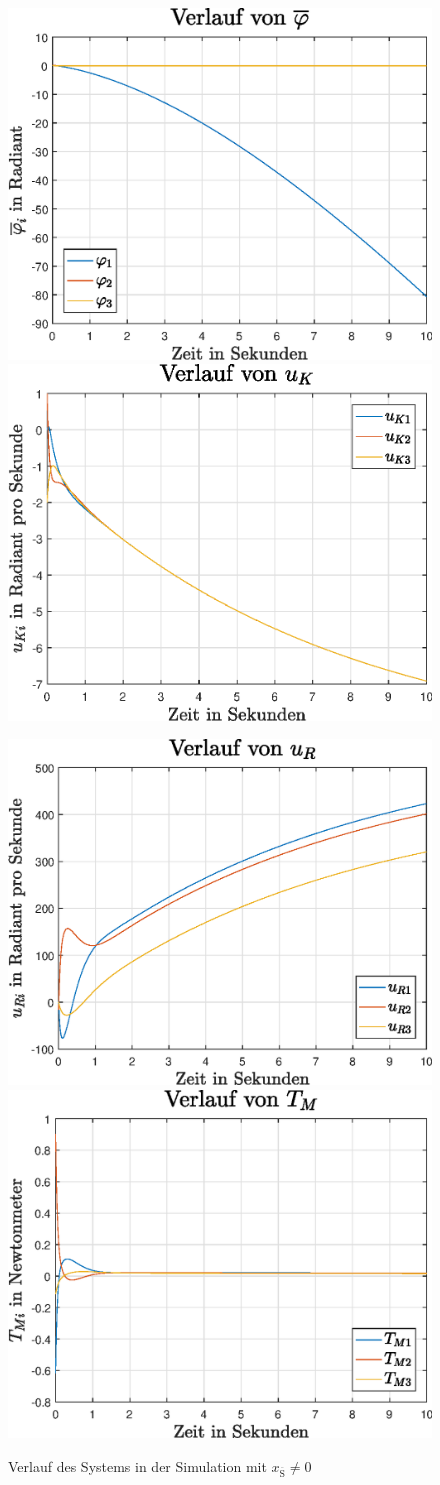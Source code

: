 \begin{figure}[h]
\centering
\includegraphics[width=0.45\linewidth]{img/lin_sim2_phi.eps}\hspace{0.7cm}
\includegraphics[width=0.45\linewidth]{img/lin_sim2_uk.eps}
\vspace{0.5cm}

\includegraphics[width=0.45\linewidth]{img/lin_sim2_ur.eps}\hspace{0.7cm}
\includegraphics[width=0.45\linewidth]{img/lin_sim2_tm.eps}
\caption{Verlauf des Systems in der Simulation mit $x_{\overline{\text{S}}}\neq0$}
\end{figure}
